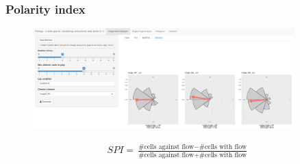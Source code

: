 \documentclass[14pt]{beamer}
\begin{document}
\begin{frame}
\frametitle{\normalsize \bf Polarity index}
\scriptsize
\centering

\begin{figure}
  \centering
  \includegraphics[width=0.9\textwidth]{images/app_variation.png}\\
\end{figure}

\begin{align}
    SPI = \frac{\text{\#cells against flow} - \text{\#cells with flow}}{\text{\#cells against flow} + \text{\#cells with flow}}
\end{align}



\end{frame}




\end{document}
